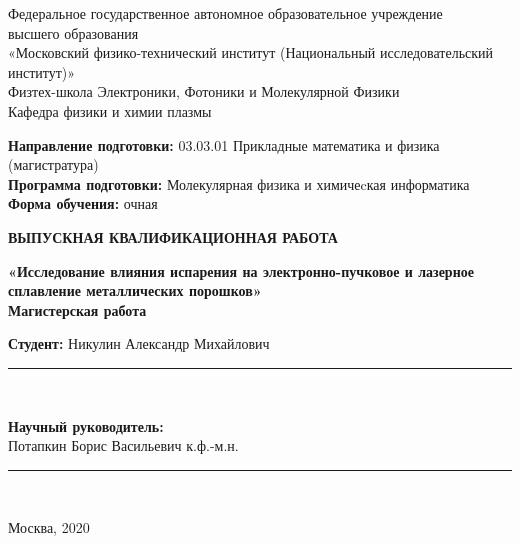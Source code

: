 \begin{center}

{\normalsize Федеральное государственное автономное
образовательное учреждение\\ высшего образования\\
«Московский физико-технический институт (Национальный исследовательский институт)»}\\
{\footnotesize Физтех-школа Электроники, Фотоники и Молекулярной Физики\\ Кафедра физики и химии плазмы}
\vspace{\baselineskip}
\vspace{\baselineskip}

{\normalsize {\bf Направление подготовки:} 03.03.01 Прикладные математика и физика (магистратура)\\
{\bf Программа подготовки:} Молекулярная физика и химичеcкая информатика\\
{\bf Форма обучения:} очная\\}
\vspace{1cm}

{\normalsize \bf ВЫПУСКНАЯ КВАЛИФИКАЦИОННАЯ РАБОТА\\}

{\normalsize \bf{«Исследование влияния испарения на электронно-пучковое и лазерное сплавление металлических порошков»\\}Магистерская работа\\}
\vspace{\baselineskip}

\end{center}
\vspace{0.5cm}

\begin{flushright}
{\normalsize {\bf Студент:} Никулин Александр Михайлович}
\vspace{\baselineskip}

{\normalsize \rule{6cm}{0.1mm}\\}
\vspace{0.5cm}
{\normalsize {\bf Научный руководитель:}\\ Потапкин Борис Васильевич к.ф.-м.н.}
\vspace{\baselineskip}

{\normalsize \rule{6cm}{0.1mm}\\}
\vspace{0.5cm}

\end{flushright}
\begin{center}
{\normalsize Москва, 2020}
\vspace{0.7cm}
\end{center}

\clearpage